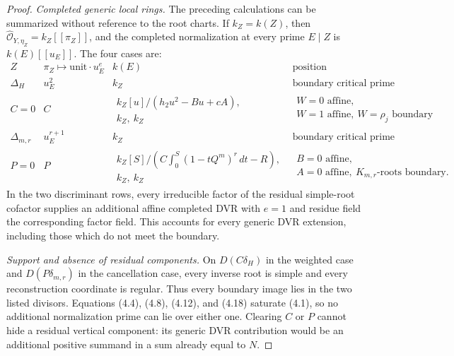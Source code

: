 \begin{proof}
\smallskip
\noindent\emph{Completed generic local rings.}
The preceding calculations can be summarized without reference to the root
charts.  If $k_Z=k(Z)$, then $\widehat{\mathcal O}_{Y,\eta_Z}=k_Z[[\pi_Z]]$,
and the completed normalization at every prime $E\mid Z$ is
$k(E)[[u_E]]$.  The four cases are:
\[
\begin{array}{c|c|c|c}
 Z&\pi_Z\mapsto\text{unit}\cdot u_E^e&k(E)&\text{position}\\ \hline
 \Delta_H&u_E^2&k_Z&\text{boundary critical prime}\\
 C=0&C&
 \begin{matrix}
  k_Z[u]/(h_2u^2-Bu+cA),\\ k_Z,\ k_Z
 \end{matrix}&
 \begin{matrix}
  W=0\text{ affine},\\ W=1\text{ affine},\ W=\rho_j\text{ boundary}
 \end{matrix}\\
 \Delta_{m,r}&u_E^{r+1}&k_Z&\text{boundary critical prime}\\
 P=0&P&
 \begin{matrix}
  k_Z[S]/(C\int_0^S(1-tQ^m)^r\,dt-R),\\ k_Z,\ k_Z
 \end{matrix}&
 \begin{matrix}
  B=0\text{ affine},\\ A=0\text{ affine},\ K_{m,r}\text{-roots boundary}.
 \end{matrix}
\end{array}                                                \tag{4.19}
\]
In the two discriminant rows, every irreducible factor of the residual
simple-root cofactor supplies an additional affine completed DVR with $e=1$
and residue field the corresponding factor field.  This accounts for every
generic DVR extension, including those which do not meet the boundary.

\smallskip
\noindent\emph{Support and absence of residual components.}
On $D(C\delta_H)$ in the weighted case and $D(P\delta_{m,r})$ in the
cancellation case, every inverse root is simple and every reconstruction
coordinate is regular.  Thus every boundary image lies in the two listed
divisors.  Equations (4.4), (4.8), (4.12), and (4.18) saturate (4.1), so no
additional normalization prime can lie over either one.  Clearing $C$ or
$P$ cannot hide a residual vertical component: its generic DVR contribution
would be an additional positive summand in a sum already equal to $N$.


\end{proof}
